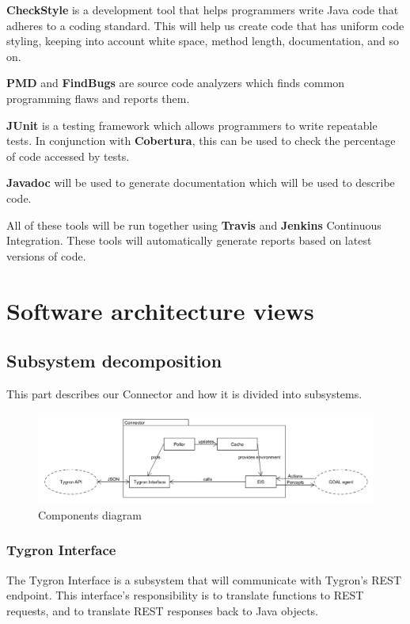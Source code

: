 \documentclass[a4paper]{article}
\begin{document}
\textbf{CheckStyle} is a development tool that helps programmers write Java code that adheres to a coding standard. This will help us create code that has uniform code styling, keeping into account white space, method length, documentation, and so on.

\textbf{PMD} and \textbf{FindBugs} are source code analyzers which finds common programming flaws and reports them.

\textbf{JUnit} is a testing framework which allows programmers to write repeatable tests. In conjunction with \textbf{Cobertura}, this can be used to  check the percentage of code accessed by tests.

\textbf{Javadoc} will be used to generate documentation which will be used to describe code. %

All of these tools will be run together using \textbf{Travis} and \textbf{Jenkins} Continuous Integration. These tools will automatically generate reports based on latest versions of code.

\clearpage

\section{Software architecture views}
\subsection{Subsystem decomposition}
This part describes our Connector and how it is divided into subsystems.

\begin{figure}[h!]
  \caption{Components diagram}
  \centering
    \includegraphics[width=1.0\textwidth]{components diagram.png}
\end{figure}

\subsubsection{Tygron Interface}
The Tygron Interface is a subsystem that will communicate with Tygron’s REST endpoint. This interface’s responsibility is to translate functions to REST requests, and to translate REST responses back to Java objects.
\end{document}

